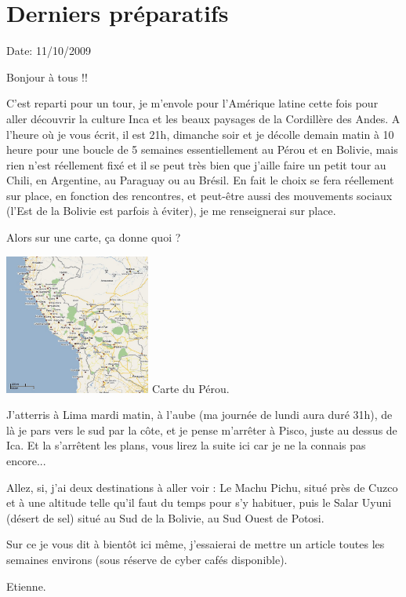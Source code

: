 \section{Derniers préparatifs}

Date: 11/10/2009

\begin{multicols}{2}

Bonjour à tous !!

C'est reparti pour un tour, je m'envole pour l'Amérique latine cette fois pour aller découvrir la culture Inca et les beaux paysages de la Cordillère des Andes. A l'heure où je vous écrit, il est 21h, dimanche soir et je décolle demain matin à 10 heure pour une boucle de 5 semaines essentiellement au Pérou et en Bolivie, mais rien n'est réellement fixé et il se peut très bien que j'aille faire un petit tour au Chili, en Argentine, au Paraguay ou au Brésil. En fait le choix se fera réellement sur place, en fonction des rencontres, et peut-être aussi des mouvements sociaux (l'Est de la Bolivie est parfois à éviter), je me renseignerai sur place.

Alors sur une carte, ça donne quoi ?

\hspace*{-0.65cm}
\includegraphics[width=4.8cm]{articles/Derniers-preparatifs/1255286224vDMd.jpg}
Carte du Pérou.

J'atterris à Lima mardi matin, à l'aube (ma journée de lundi aura duré 31h), de là je pars vers le sud par la côte, et je pense m'arrêter à Pisco, juste au dessus de Ica. Et la s'arrêtent les plans, vous lirez la suite ici car je ne la connais pas encore...

Allez, si, j'ai deux destinations à aller voir : Le Machu Pichu, situé près de Cuzco et à une altitude telle qu'il faut du temps pour s'y habituer, puis le Salar Uyuni (désert de sel) situé au Sud de la Bolivie, au Sud Ouest de Potosi.

Sur ce je vous dit à bientôt ici même, j'essaierai de mettre un article toutes les semaines environs (sous réserve de cyber cafés disponible).

Etienne.

\end{multicols}


